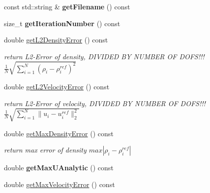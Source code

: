 \begin{DoxyCompactItemize}
\item 
\hypertarget{classnatrium_1_1ErrorStats_a341ef071a84aa3a2b78485ce90bca7b2}{const std\-::string \& {\bfseries get\-Filename} () const }\label{classnatrium_1_1ErrorStats_a341ef071a84aa3a2b78485ce90bca7b2}

\item 
\hypertarget{classnatrium_1_1ErrorStats_ab710182a15d0c548fbc8c3b071dbebd1}{size\-\_\-t {\bfseries get\-Iteration\-Number} () const }\label{classnatrium_1_1ErrorStats_ab710182a15d0c548fbc8c3b071dbebd1}

\item 
double \hyperlink{classnatrium_1_1ErrorStats_a66f817c7daaf15724d5d42de4f17a1e8}{get\-L2\-Density\-Error} () const 
\begin{DoxyCompactList}\small\item\em return L2-\/\-Error of density, D\-I\-V\-I\-D\-E\-D B\-Y N\-U\-M\-B\-E\-R O\-F D\-O\-F\-S!!! $ \frac{1}{N} \sqrt{ \sum_{i=1}^{N} (\rho_{i} - \rho_{i}^{ref})^{2} } $ \end{DoxyCompactList}\item 
double \hyperlink{classnatrium_1_1ErrorStats_a201f625a3607a814fdd645aabfe37fbc}{get\-L2\-Velocity\-Error} () const 
\begin{DoxyCompactList}\small\item\em return L2-\/\-Error of velocity, D\-I\-V\-I\-D\-E\-D B\-Y N\-U\-M\-B\-E\-R O\-F D\-O\-F\-S!!! $ \frac{1}{N} \sqrt{ \sum_{i=1}^{N} \|u_{i} - u_{i}^{ref}\|_{2}^{2} } $ \end{DoxyCompactList}\item 
\hypertarget{classnatrium_1_1ErrorStats_a8e32b3e8c8d141b6cdcf5428613a875e}{double \hyperlink{classnatrium_1_1ErrorStats_a8e32b3e8c8d141b6cdcf5428613a875e}{get\-Max\-Density\-Error} () const }\label{classnatrium_1_1ErrorStats_a8e32b3e8c8d141b6cdcf5428613a875e}

\begin{DoxyCompactList}\small\item\em return max error of density $ max | \rho_{i} - \rho_{i}^{ref} | $ \end{DoxyCompactList}\item 
\hypertarget{classnatrium_1_1ErrorStats_a350f6b6fcc91f18006095331b0aa430c}{double {\bfseries get\-Max\-U\-Analytic} () const }\label{classnatrium_1_1ErrorStats_a350f6b6fcc91f18006095331b0aa430c}

\item 
\hypertarget{classnatrium_1_1ErrorStats_a48ea1bfc5db4dad6369b4b2991aa1f5c}{double \hyperlink{classnatrium_1_1ErrorStats_a48ea1bfc5db4dad6369b4b2991aa1f5c}{get\-Max\-Velocity\-Error} () const }\label{classnatrium_1_1ErrorStats_a48ea1bfc5db4dad6369b4b2991aa1f5c}


\end{DoxyCompactItemize}

